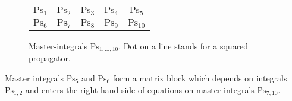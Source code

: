\documentclass[sort&compress]{elsarticle}
\begin{document}
\begin{figure}
	\centering
	\setlength{\tabcolsep}{0pt}
	\renewcommand{\arraystretch}{0.5}
	\newcommand{\miscale}{0.4}
	\newcommand{\misize}{\footnotesize}
	\begin{tabular}{ccccc}
		\misize $\mathrm{Ps}_1$ &
		\misize $\mathrm{Ps}_2$ &
		\misize $\mathrm{Ps}_3$ &
		\misize $\mathrm{Ps}_4$ &
		\misize $\mathrm{Ps}_5$ \\
		\misize $\mathrm{Ps}_6$ &
		\misize $\mathrm{Ps}_7$ &
		\misize $\mathrm{Ps}_8$ &
		\misize $\mathrm{Ps}_9$ &
		\misize $\mathrm{Ps}_{10}$
	\end{tabular}
	\setlength{\tabcolsep}{6pt}
	\renewcommand{\arraystretch}{1.0}
	\caption{
		Master-integrals $\mathrm{Ps}_{1, \ldots, 10}$.
		Dot on a line stands for a squared propagator.
	}
	\label{pic:ps-masters}
\end{figure}

Master integrals $\mathrm{Ps}_5$ and $\mathrm{Ps}_6$ form a matrix block which depends on integrals $\mathrm{Ps}_{1,2}$ and enters the right-hand side of equations on master integrals $\mathrm{Ps}_{7,10}$.
\end{document}
